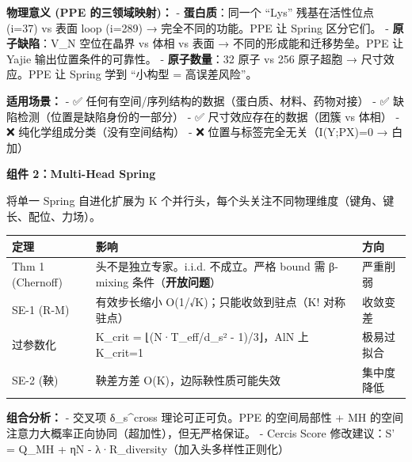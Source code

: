 \documentclass[
  12pt,
]{ctexart}
\begin{document}
\textbf{物理意义 (PPE 的三领域映射)：} - \textbf{蛋白质}：同一个 ``Lys''
残基在活性位点 (i=37) vs 表面 loop (i=289) → 完全不同的功能。PPE 让
Spring 区分它们。 - \textbf{原子缺陷}：V\_N 空位在晶界 vs 体相 vs 表面 →
不同的形成能和迁移势垒。PPE 让 Yajie 输出位置条件的可靠性。 -
\textbf{原子数量}：32 原子 vs 256 原子超胞 → 尺寸效应。PPE 让 Spring
学到 ``小构型 = 高误差风险''。

\textbf{适用场景：} - ✅
任何有空间/序列结构的数据（蛋白质、材料、药物对接） - ✅
缺陷检测（位置是缺陷身份的一部分） - ✅ 尺寸效应存在的数据（团簇 vs
体相） - ❌ 纯化学组成分类（没有空间结构） - ❌
位置与标签完全无关（I(Y;P\textbar X)=0 → 白加）

\textbf{组件 2：Multi-Head Spring}

将单一 Spring 自进化扩展为 K
个并行头，每个头关注不同物理维度（键角、键长、配位、力场）。

\begin{longtable}[]{@{}
  >{\raggedright\arraybackslash}p{}
  >{\raggedright\arraybackslash}p{}
  >{\raggedright\arraybackslash}p{}@{}}
\toprule\noalign{}
\begin{minipage}[b]{\linewidth}\raggedright
定理
\end{minipage} & \begin{minipage}[b]{\linewidth}\raggedright
影响
\end{minipage} & \begin{minipage}[b]{\linewidth}\raggedright
方向
\end{minipage} \\
\midrule\noalign{}
\endhead
\bottomrule\noalign{}
\endlastfoot
Thm 1 (Chernoff) & 头不是独立专家。i.i.d. 不成立。严格 bound 需 β-mixing
条件（\textbf{开放问题}） & 严重削弱 \\
SE-1 (R-M) & 有效步长缩小 O(1/√K)；只能收敛到驻点（K! 对称驻点） &
收敛变差 \\
过参数化 & K\_crit = ⌊(N·T\_eff/d\_s² - 1)/3⌋，AlN 上 K\_crit=1 &
极易过拟合 \\
SE-2 (鞅) & 鞅差方差 O(K)，边际鞅性质可能失效 & 集中度降低 \\
\end{longtable}

\textbf{组合分析：} - 交叉项 δ\_s\^{}cross 理论可正可负。PPE
的空间局部性 + MH 的空间注意力大概率正向协同（超加性），但无严格保证。 -
Cercis Score 修改建议：S' = Q\_MH + ηN -
λ·R\_diversity（加入头多样性正则化）
\end{document}
